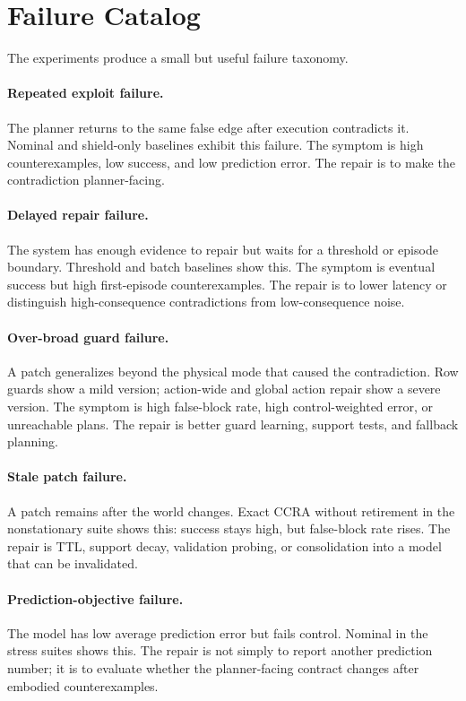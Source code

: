 \documentclass{article}
\begin{document}
\section{Failure Catalog}

The experiments produce a small but useful failure taxonomy.

\paragraph{Repeated exploit failure.}
The planner returns to the same false edge after execution contradicts it. Nominal and shield-only baselines exhibit this failure. The symptom is high counterexamples, low success, and low prediction error. The repair is to make the contradiction planner-facing.

\paragraph{Delayed repair failure.}
The system has enough evidence to repair but waits for a threshold or episode boundary. Threshold and batch baselines show this. The symptom is eventual success but high first-episode counterexamples. The repair is to lower latency or distinguish high-consequence contradictions from low-consequence noise.

\paragraph{Over-broad guard failure.}
A patch generalizes beyond the physical mode that caused the contradiction. Row guards show a mild version; action-wide and global action repair show a severe version. The symptom is high false-block rate, high control-weighted error, or unreachable plans. The repair is better guard learning, support tests, and fallback planning.

\paragraph{Stale patch failure.}
A patch remains after the world changes. Exact CCRA without retirement in the nonstationary suite shows this: success stays high, but false-block rate rises. The repair is TTL, support decay, validation probing, or consolidation into a model that can be invalidated.

\paragraph{Prediction-objective failure.}
The model has low average prediction error but fails control. Nominal in the stress suites shows this. The repair is not simply to report another prediction number; it is to evaluate whether the planner-facing contract changes after embodied counterexamples.
\end{document}
